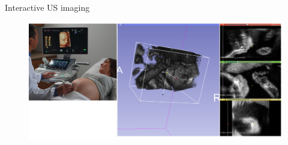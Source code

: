 {


\begin{frame}{Interactive US imaging}
      \begin{figure}
        \centering
        \includegraphics[width=1.0\textwidth]{./figures/3dslicer/versions/drawing-v00.png}
      \end{figure}
\end{frame}
}







%
%







